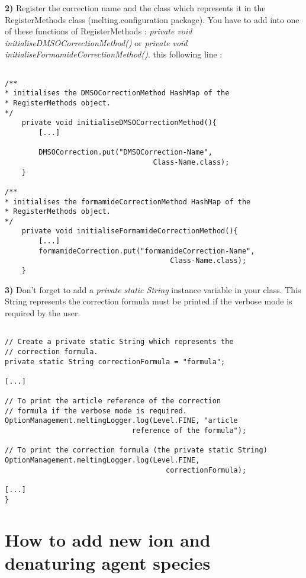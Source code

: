 \documentclass{article}
\begin{document}
\textbf{2)} Register the correction name and the class which represents it in the RegisterMethods
class (melting.configuration package). 
You have to add into one of these functions of RegisterMethods : 
\textit{private void initialiseDMSOCorrectionMethod()} or \textit{private void initialiseFormamideCorrectionMethod()}.
this following line :

\begin{verbatim}

/**
* initialises the DMSOCorrectionMethod HashMap of the 
* RegisterMethods object.
*/
	private void initialiseDMSOCorrectionMethod(){
		[...]
		
		DMSOCorrection.put("DMSOCorrection-Name", 
		                           Class-Name.class);
	}
	
/**
* initialises the formamideCorrectionMethod HashMap of the 
* RegisterMethods object.
*/
	private void initialiseFormamideCorrectionMethod(){
		[...]
		formamideCorrection.put("formamideCorrection-Name", 
		                               Class-Name.class);
	}

\end{verbatim} 


\textbf{3)} Don't forget to add a \textit{private static String} instance variable in your class. This
String represents the correction formula must be printed if the verbose mode is required by the user.

\begin{verbatim}

// Create a private static String which represents the 
// correction formula.
private static String correctionFormula = "formula";

[...]

// To print the article reference of the correction 
// formula if the verbose mode is required.
OptionManagement.meltingLogger.log(Level.FINE, "article 
                              reference of the formula");

// To print the correction formula (the private static String)
OptionManagement.meltingLogger.log(Level.FINE, 
                                      correctionFormula);

[...]
}

\end{verbatim}

\section{How to add new ion and denaturing agent species}
\end{document}

